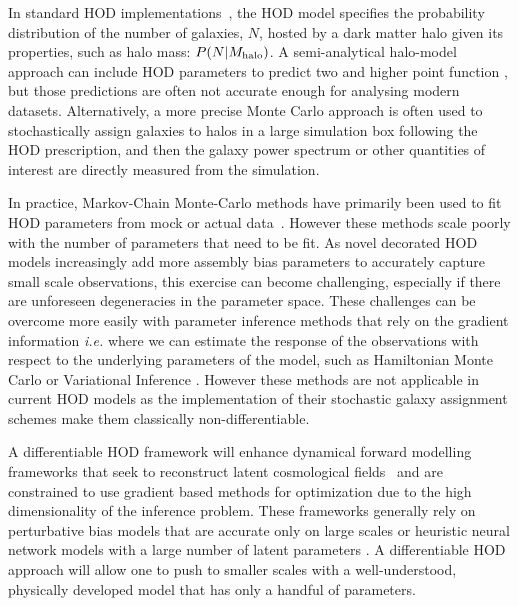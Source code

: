 \documentclass[a4paper,usenatbib]{mnras}
\newcommand{\CH}[1]{{\color{green}CH: #1}}
\begin{document}
In standard HOD implementations~\citep[\emph{e.g}][]{2005zheng},  %
the HOD model specifies the probability distribution of the number
of galaxies, $N$, hosted by a dark matter halo given its properties, such as halo 
mass: $P(N|M_{\rm halo})$. A semi-analytical halo-model approach can include HOD parameters to predict two and higher point function \citep{cooray2002}, but those predictions are often not accurate 
enough for analysing modern datasets. Alternatively, a more precise Monte Carlo approach is often used to stochastically assign galaxies to halos in a large simulation box following the HOD prescription, and then the galaxy power spectrum or other quantities of interest are directly measured from the simulation. 

In practice, Markov-Chain Monte-Carlo methods have primarily been 
used to fit HOD parameters from mock or actual data~\citep[\emph{e.g.}][]{white2011, rodriguez-torres2016, sinha2018}. However these methods scale poorly with the number of parameters that need to be fit.
As novel decorated HOD models increasingly add more assembly bias parameters to accurately capture small scale observations,
this exercise can become challenging, especially if there are unforeseen degeneracies in the parameter space.
These challenges can be overcome more easily with parameter inference methods that rely on the gradient information 
\emph{i.e.} where we can estimate the response of the observations with respect to the underlying parameters of the model,
such as Hamiltonian Monte Carlo \citep{1987PhLB..195..216D} or Variational Inference \citep{peterson1987mean,2003PhDT.......250B,2016arXiv160100670B}.
However these methods are not applicable in current HOD models as the implementation of their stochastic galaxy assignment schemes make them classically non-differentiable. 

A differentiable HOD framework will enhance dynamical forward modelling frameworks that seek to reconstruct latent cosmological fields~\citep[\emph{e.g.}][]{2017JCAP...12..009S}
and are constrained to use gradient based methods for optimization due to the high dimensionality of the inference problem.
These frameworks generally rely on perturbative bias models that are accurate only on large scales \citep{Schmidt18, Modi19} 
or heuristic neural network models with a large number of latent parameters \citep{2018JCAP...10..028M}.
A differentiable HOD approach will allow one to push to smaller scales with a well-understood, physically developed model that has only a handful of parameters.
\end{document}
